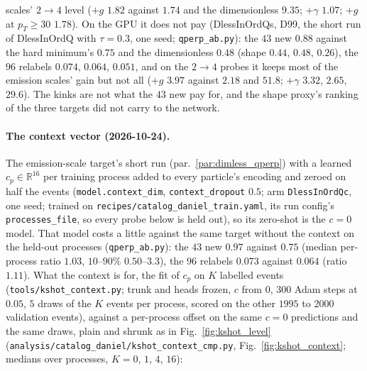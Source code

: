 \documentclass[11pt]{article}
\newcommand{\code}[1]{\texttt{#1}}
\begin{document}
scales' $2\to4$ level ($+g$ $1.82$ against $1.74$ and the dimensionless $9.35$; $+\gamma$ $1.07$; $+g$ at $p_T\ge30$
$1.78$). On the GPU it does not pay (DlessInOrdQs, D99, the short run of DlessInOrdQ with $\tau=0.3$, one seed;
\code{qperp\_ab.py}): the $43$ new $0.88$ against the hard minimum's $0.75$ and the dimensionless $0.48$ (shape $0.44$,
$0.48$, $0.26$), the $96$ relabels $0.074$, $0.064$, $0.051$, and on the $2\to4$ probes it keeps most of the emission
scales' gain but not all ($+g$ $3.97$ against $2.18$ and $51.8$; $+\gamma$ $3.32$, $2.65$, $29.6$). The kinks are not what
the $43$ new pay for, and the shape proxy's ranking of the three targets did not carry to the network.

\paragraph{The context vector (2026-10-24).} The emission-scale target's short run (par.~\ref{par:dimless_qperp}) with a
learned $c_p\in\mathbb R^{16}$ per training process added to every particle's encoding and zeroed on half the events
(\code{model.context\_dim}, \code{context\_dropout} $0.5$; arm \code{DlessInOrdQc}, one seed; trained on
\code{recipes/catalog\_daniel\_train.yaml}, its run config's \code{processes\_file}, so every probe below is held out), so its
zero-shot is the $c=0$ model. That model costs a little against the same target without the context on the held-out processes (\code{qperp\_ab.py}): the
$43$ new $0.97$ against $0.75$ (median per-process ratio $1.03$, $10$--$90\%$ $0.50$--$3.3$), the $96$ relabels
$0.073$ against $0.064$ (ratio $1.11$). What the context is for, the fit of $c_p$ on $K$ labelled events
(\code{tools/kshot\_context.py}; trunk and heads frozen, $c$ from $0$, $300$ Adam steps at
$0.05$, $5$ draws of the $K$ events per process, scored on the other $1995$ to $2000$ validation events), against a
per-process offset on the same $c=0$ predictions and the same draws, plain and shrunk as in Fig.~\ref{fig:kshot_level}
(\code{analysis/catalog\_daniel/kshot\_context\_cmp.py}, Fig.~\ref{fig:kshot_context}; medians over processes, $K=0$,
$1$, $4$, $16$):
\end{document}
